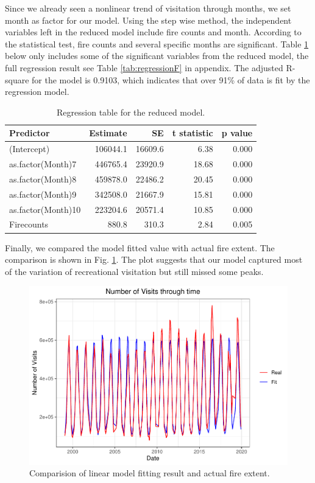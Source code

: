 \documentclass[
  12pt,
]{article}
\begin{document}
Since we already seen a nonlinear trend of visitation through months, we set month as factor for our model. Using the step wise method, the independent variables left in the reduced model include fire counts and month. According to the statistical test, fire counts and several specific months are significant.
Table \ref{tab:regression} below only includes some of the significant variables from the reduced model, the full regression result see Table \ref{tab:regressionF} in appendix. The adjusted R-square for the model is 0.9103, which indicates that over 91\% of data is fit by the regression model.

\begin{table}

\caption{\label{tab:regression}Regression table for the reduced model. }
\centering
\begin{tabular}[t]{l|r|r|r|r}
\hline
Predictor & Estimate & SE & t statistic & p value\\
\hline
(Intercept) & 106044.1 & 16609.6 & 6.38 & 0.000\\
\hline
as.factor(Month)7 & 446765.4 & 23920.9 & 18.68 & 0.000\\
\hline
as.factor(Month)8 & 459878.0 & 22486.2 & 20.45 & 0.000\\
\hline
as.factor(Month)9 & 342508.0 & 21667.9 & 15.81 & 0.000\\
\hline
as.factor(Month)10 & 223204.6 & 20571.4 & 10.85 & 0.000\\
\hline
Firecounts & 880.8 & 310.3 & 2.84 & 0.005\\
\hline
\end{tabular}
\end{table}

Finally, we compared the model fitted value with actual fire extent. The comparison is shown in Fig. \ref{fig:fitplot}. The plot suggests that our model captured most of the variation of recreational visitation but still missed some peaks.

\begin{figure}
\centering
\includegraphics{CodeFinal_files/figure-latex/fitplot-1.pdf}
\caption{\label{fig:fitplot}Comparision of linear model fitting result and actual fire extent.}
\end{figure}
\end{document}
